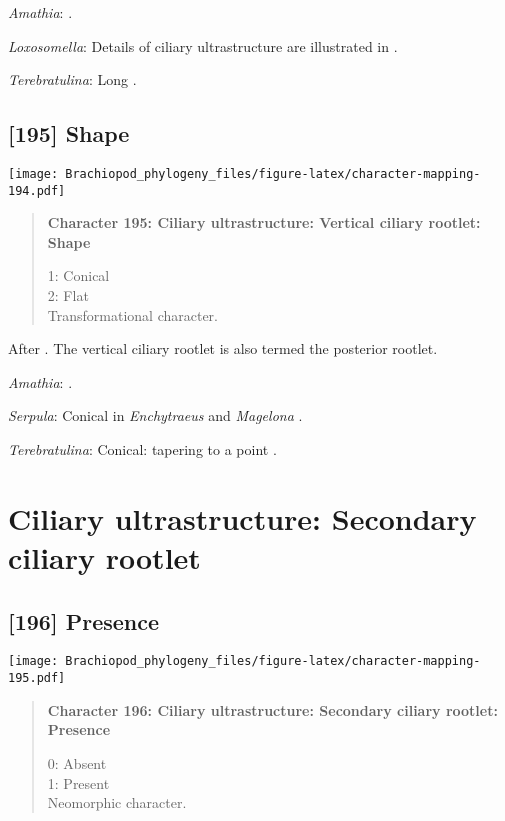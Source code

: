 \documentclass[openany]{book}
\theoremstyle{definition}
\theoremstyle{definition}
\theoremstyle{definition}
\theoremstyle{remark}
\begin{document}
\hypertarget{Amathia-coding-194}{}
\emph{Amathia}: \citet{Reed1982}.

\hypertarget{Loxosomella-coding-194}{}
\emph{Loxosomella}: Details of ciliary ultrastructure are illustrated in
\citet{Nielsen1976}.

\hypertarget{Terebratulina-coding-194}{}
\emph{Terebratulina}: Long \citep{Luter1995}.

\subsection*{{[}195{]} Shape}\label{shape}

\texttt{[image: Brachiopod\_phylogeny\_files/figure-latex/character-mapping-194.pdf]}

\begin{quote}
\textbf{Character 195: Ciliary ultrastructure: Vertical ciliary rootlet:
Shape}

1: Conical\\
2: Flat\\
Transformational character.
\end{quote}

After \citet{Lundin2009}. The vertical ciliary rootlet is also termed
the posterior rootlet.

\hypertarget{Amathia-coding-195}{}
\emph{Amathia}: \citet{Reed1982}.

\hypertarget{Serpula-coding-195}{}
\emph{Serpula}: Conical in \emph{Enchytraeus} \citep{Reger1967} and
\emph{Magelona} \citep{Bartolomaeus1995}.

\hypertarget{Terebratulina-coding-195}{}
\emph{Terebratulina}: Conical: tapering to a point \citep{Luter1995}.

\section{Ciliary ultrastructure: Secondary ciliary
rootlet}\label{ciliary-ultrastructure-secondary-ciliary-rootlet}

\subsection*{{[}196{]} Presence}\label{presence-5}

\texttt{[image: Brachiopod\_phylogeny\_files/figure-latex/character-mapping-195.pdf]}

\begin{quote}
\textbf{Character 196: Ciliary ultrastructure: Secondary ciliary
rootlet: Presence}

0: Absent\\
1: Present\\
Neomorphic character.
\end{quote}
\end{document}
